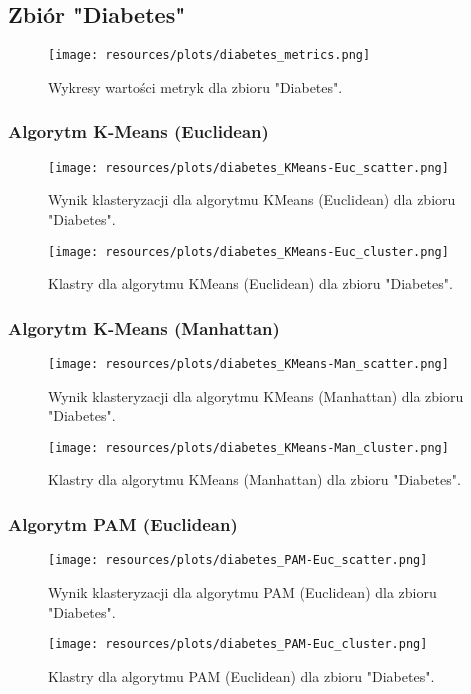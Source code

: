 \subsection{Zbiór "Diabetes"}
  \begin{figure}[H]
    \center
    \texttt{[image: resources/plots/diabetes\_metrics.png]}
    \caption{Wykresy wartości metryk dla zbioru "Diabetes".}
  \end{figure}

  

  \subsubsection{Algorytm K-Means (Euclidean)} 
    \begin{figure}[H]
      \center
      \texttt{[image: resources/plots/diabetes\_KMeans-Euc\_scatter.png]}
      \caption{Wynik klasteryzacji dla algorytmu KMeans (Euclidean) dla zbioru "Diabetes".}
    \end{figure}
    \begin{figure}[H]
      \center
      \texttt{[image: resources/plots/diabetes\_KMeans-Euc\_cluster.png]}
      \caption{Klastry dla algorytmu KMeans (Euclidean) dla zbioru "Diabetes".}
    \end{figure}

  \subsubsection{Algorytm K-Means (Manhattan)} 
    \begin{figure}[H]
      \center
      \texttt{[image: resources/plots/diabetes\_KMeans-Man\_scatter.png]}
      \caption{Wynik klasteryzacji dla algorytmu KMeans (Manhattan) dla zbioru "Diabetes".}
    \end{figure}
    \begin{figure}[H]
      \center
      \texttt{[image: resources/plots/diabetes\_KMeans-Man\_cluster.png]}
      \caption{Klastry dla algorytmu KMeans (Manhattan) dla zbioru "Diabetes".}
    \end{figure}

  \subsubsection{Algorytm PAM (Euclidean)} 
    \begin{figure}[H]
      \center
      \texttt{[image: resources/plots/diabetes\_PAM-Euc\_scatter.png]}
      \caption{Wynik klasteryzacji dla algorytmu PAM (Euclidean) dla zbioru "Diabetes".}
    \end{figure}
    \begin{figure}[H]
      \center
      \texttt{[image: resources/plots/diabetes\_PAM-Euc\_cluster.png]}
      \caption{Klastry dla algorytmu PAM (Euclidean) dla zbioru "Diabetes".}
    \end{figure}

